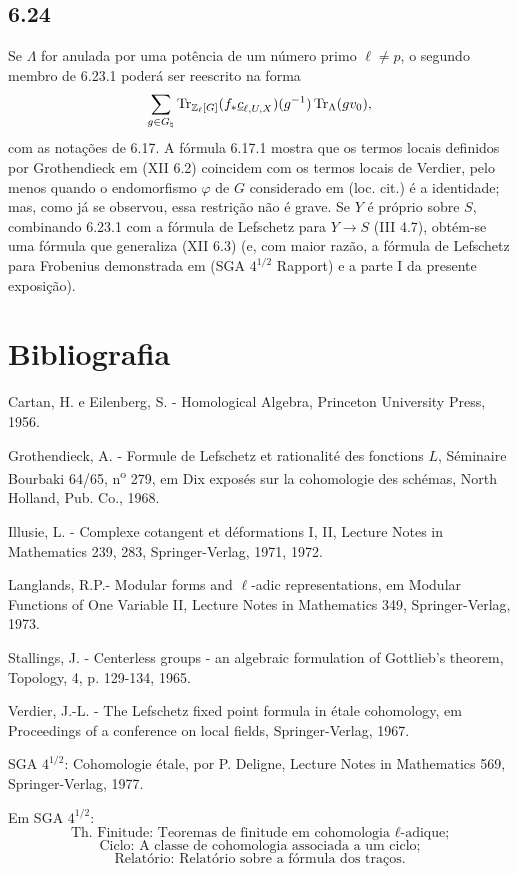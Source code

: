 \subsection*{6.24}
Se $\Lambda$ for anulada por uma potência de um número primo $\ell\ne p$, o segundo membro de 6.23.1 poderá ser reescrito na forma
\[
\sum_{g\in G_{\natural}}
\operatorname{Tr}_{\mathbb Z_{\ell}[G]}(f_*\underline c_{\ell,U,X})(g^{-1})
\operatorname{Tr}_{\Lambda}(gv_0),
\]
com as notações de 6.17. A fórmula 6.17.1 mostra que os termos locais definidos por Grothendieck em (XII 6.2) coincidem com os termos locais de Verdier, pelo menos quando o endomorfismo $\varphi$ de $G$ considerado em (loc. cit.) é a identidade; mas, como já se observou, essa restrição não é grave. Se $Y$ é próprio sobre $S$, combinando 6.23.1 com a fórmula de Lefschetz para $Y\to S$ (III 4.7), obtém-se uma fórmula que generaliza (XII 6.3) (e, com maior razão, a fórmula de Lefschetz para Frobenius demonstrada em (SGA $4^{1/2}$ Rapport) e a parte I da presente exposição).

\section*{Bibliografia}

\begin{enumerate}[label={[\arabic*]}]
\item Cartan, H. e Eilenberg, S. - Homological Algebra, Princeton University Press, 1956.
\item Grothendieck, A. - Formule de Lefschetz et rationalité des fonctions $L$, Séminaire Bourbaki 64/65, n\textsuperscript{o} 279, em Dix exposés sur la cohomologie des schémas, North Holland, Pub. Co., 1968.
\item Illusie, L. - Complexe cotangent et déformations I, II, Lecture Notes in Mathematics 239, 283, Springer-Verlag, 1971, 1972.
\item Langlands, R.P.- Modular forms and $\ell$-adic representations, em Modular Functions of One Variable II, Lecture Notes in Mathematics 349, Springer-Verlag, 1973.
\item Stallings, J. - Centerless groups - an algebraic formulation of Gottlieb's theorem, Topology, 4, p. 129-134, 1965.
\item Verdier, J.-L. - The Lefschetz fixed point formula in étale cohomology, em Proceedings of a conference on local fields, Springer-Verlag, 1967.
\end{enumerate}

SGA $4^{1/2}$: Cohomologie étale, por P. Deligne, Lecture Notes in Mathematics 569, Springer-Verlag, 1977.

Em SGA $4^{1/2}$:
\[
\text{Th. Finitude: Teoremas de finitude em cohomologia }\ell\text{-adique;}
\]
\[
\text{Ciclo: A classe de cohomologia associada a um ciclo;}
\]
\[
\text{Relatório: Relatório sobre a fórmula dos traços.}
\]
